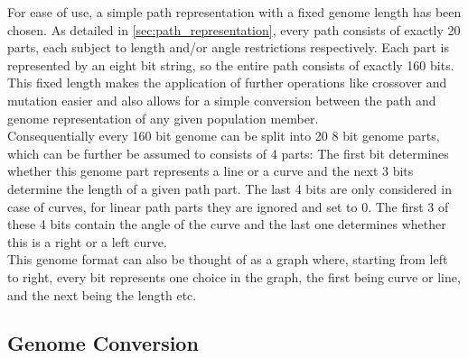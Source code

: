 For ease of use, a simple path representation with a fixed genome length has been chosen. As detailed in \ref{sec:path_representation}, every path consists of exactly 20 parts, each subject to length and/or angle restrictions respectively. Each part is represented by an eight bit string, so the entire path consists of exactly 160 bits. This fixed length makes the application of further operations like crossover and mutation easier and also allows for a simple conversion between the path and genome representation of any given population member. \\
Consequentially every 160 bit genome can be split into 20 8 bit genome parts, which can be further be assumed to consists of 4 parts: The first bit determines whether this genome part represents a line or a curve and the next 3 bits determine the length of a given path part. The last 4 bits are only considered in case of curves, for linear path parts they are ignored and set to 0. The first 3 of these 4 bits contain the angle of the curve and the last one determines whether this is a right or a left curve. \\
This genome format can also be thought of as a graph where, starting from left to right, every bit represents one choice in the graph, the first being curve or line, and the next being the length etc. 

\subsection{Genome Conversion}
\label{sec:genome_conversion}

